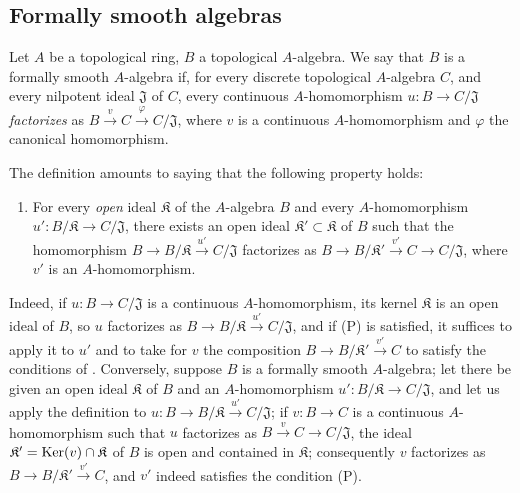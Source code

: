 \subsection{Formally smooth algebras}
\label{subsection:0.19.3}

\begin{definition}[19.3.1]
\label{0.19.3.1}
Let $A$ be a topological ring, $B$ a topological $A$-algebra.
We say that $B$ is a formally smooth $A$-algebra if, for every \textup{discrete} topological $A$-algebra $C$, and every \textup{nilpotent} ideal $\mathfrak{J}$ of $C$, every continuous $A$-homomorphism $u:B\to C/\mathfrak{J}$ \emph{factorizes} as $B\xrightarrow{v}C\xrightarrow{\varphi}C/\mathfrak{J}$, where $v$ is a continuous $A$-homomorphism and $\varphi$ the canonical homomorphism.
\end{definition}

The definition  amounts to saying that the following property holds:
\begin{enumerate}
  \item[(P)] For every \emph{open} ideal $\mathfrak K$ of the $A$-algebra $B$ and every $A$-homomorphism $u':B/\mathfrak K\to C/\mathfrak{J}$, there exists an open ideal $\mathfrak K'\subset\mathfrak K$ of $B$ such that the homomorphism
  $B\to B/\mathfrak K\xrightarrow{u'}C/\mathfrak{J}$ factorizes as $B\to B/\mathfrak K'\xrightarrow{v'}C\to C/\mathfrak{J}$,
  where $v'$ is an $A$-homomorphism.
\end{enumerate}

Indeed, if $u:B\to C/\mathfrak{J}$ is a continuous $A$-homomorphism, its kernel $\mathfrak K$ is an open ideal of $B$, so $u$ factorizes as $B\to B/\mathfrak K\xrightarrow{u'}C/\mathfrak{J}$, and if (P) is satisfied, it suffices to apply it to $u'$ and to take for $v$ the composition $B\to B/\mathfrak K'\xrightarrow{v'}C$ to satisfy the conditions of .
Conversely, suppose $B$ is a formally smooth $A$-algebra;
let there be given an open ideal $\mathfrak K$ of $B$ and an $A$-homomorphism $u':B/\mathfrak K\to C/\mathfrak{J}$, and let us apply the definition  to $u:B\to B/\mathfrak K\xrightarrow{u'}C/\mathfrak{J}$;
if $v:B\to C$ is a continuous $A$-homomorphism such that $u$ factorizes as $B\xrightarrow{v}C\to C/\mathfrak{J}$, the ideal $\mathfrak K'=\operatorname{Ker}(v)\cap\mathfrak K$ of $B$ is open and contained in $\mathfrak K$;
consequently $v$ factorizes as $B\to B/\mathfrak K'\xrightarrow{v'}C$, and $v'$ indeed satisfies the condition (P).

